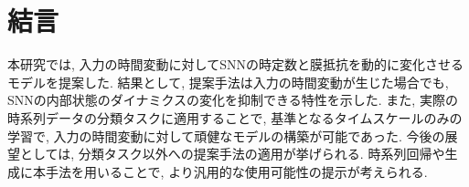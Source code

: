 \section{結言}

本研究では, 入力の時間変動に対してSNNの時定数と膜抵抗を動的に変化させるモデルを提案した.
結果として, 提案手法は入力の時間変動が生じた場合でも, SNNの内部状態のダイナミクスの変化を抑制できる特性を示した.
また, 実際の時系列データの分類タスクに適用することで, 基準となるタイムスケールのみの学習で, 入力の時間変動に対して頑健なモデルの構築が可能であった.
今後の展望としては, 分類タスク以外への提案手法の適用が挙げられる.
時系列回帰や生成に本手法を用いることで, より汎用的な使用可能性の提示が考えられる.
% 
% 
% 